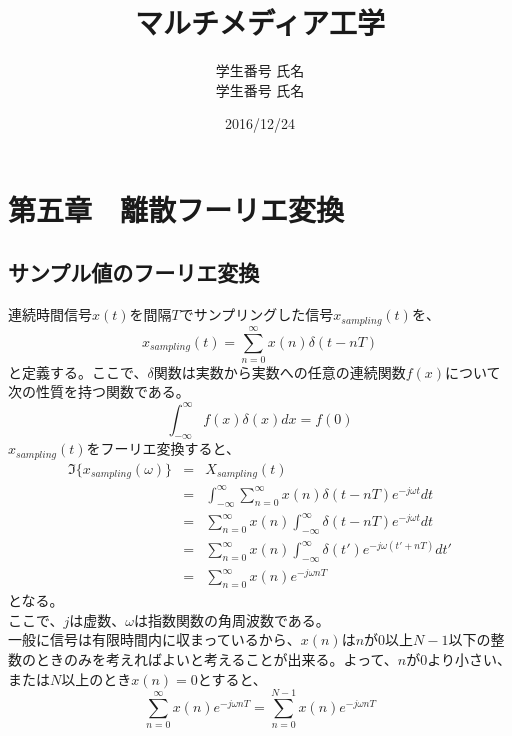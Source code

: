 \documentclass[a4paper]{jsarticle}
\title{マルチメディア工学}
\author{学生番号 氏名 \\ 学生番号 氏名}
\date{2016/12/24}
\begin{document}
\maketitle
\section{第五章　離散フーリエ変換}
\subsection{サンプル値のフーリエ変換}
連続時間信号$x\left(t\right)$を間隔$T$でサンプリングした信号$x_{sampling} \left( t \right)$を、
\begin{equation}
x_{sampling} \left( t \right) = \sum_{n=0}^{ \infty } x \left( n\right) \delta \left( t-nT \right)
\end{equation}
と定義する。ここで、$\delta$関数は実数から実数への任意の連続関数$f \left( x \right)$について次の性質を持つ関数である。
\begin{equation}
\int_{- \infty }^{ \infty } f \left( x \right) \delta \left( x \right) dx = f \left( 0 \right)
\end{equation}
$x_{sampling} \left( t \right)$をフーリエ変換すると、
\begin{eqnarray}
	\mathfrak{I} \bigl\{ x_{sampling} \left( \omega \right) \bigr\} &=& X_{sampling} \left( t \right) \nonumber \\
	&=& \int _{ - \infty } ^{ \infty } \sum _{ n = 0 } ^{ \infty } x \left( n \right) \delta \left( t-nT \right) e ^ { -j \omega t } dt \nonumber \\
	&=& \sum _{ n = 0 } ^{ \infty } x \left( n \right) \int_{- \infty } ^{ \infty} \delta \left( t-nT \right) e ^{ -j \omega t } dt \nonumber \\
	&=& \sum _{ n = 0 } ^{ \infty } x \left( n \right) \int_{- \infty } ^{ \infty} \delta \left( t' \right) e ^{ -j \omega \left( t' + nT \right) } dt' \nonumber \\
	&=& \sum _{ n = 0 } ^{ \infty } x \left( n \right) e ^ { -j \omega nT }
\end{eqnarray}
となる。\\
ここで、$j$は虚数、$\omega$は指数関数の角周波数である。\\
一般に信号は有限時間内に収まっているから、$x \left( n \right)$は$n$が$0$以上$N-1$以下の整数のときのみを考えればよいと考えることが出来る。よって、$n$が$0$より小さい、または$N$以上のとき$x \left( n \right) = 0$とすると、
\begin{equation}
\sum _{ n = 0 } ^{ \infty } x \left( n \right) e ^ { -j \omega nT } = \sum _{ n = 0 } ^{ N - 1 } x \left( n \right) e ^ { -j \omega nT }
\end{equation}
\end{document}
